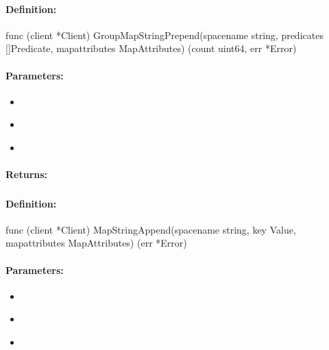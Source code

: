 \paragraph{Definition:}
\begin{gocode}
func (client *Client) GroupMapStringPrepend(spacename string, predicates []Predicate, mapattributes MapAttributes) (count uint64, err *Error)
\end{gocode}

\paragraph{Parameters:}
\begin{itemize}[noitemsep]
\item {}\\

\item {}\\

\item {}\\

\end{itemize}

\paragraph{Returns:}


\pagebreak
\subsubsection{}
\label{api:Go:MapStringAppend}


\paragraph{Definition:}
\begin{gocode}
func (client *Client) MapStringAppend(spacename string, key Value, mapattributes MapAttributes) (err *Error)
\end{gocode}

\paragraph{Parameters:}
\begin{itemize}[noitemsep]
\item {}\\

\item {}\\

\item {}\\

\end{itemize}


